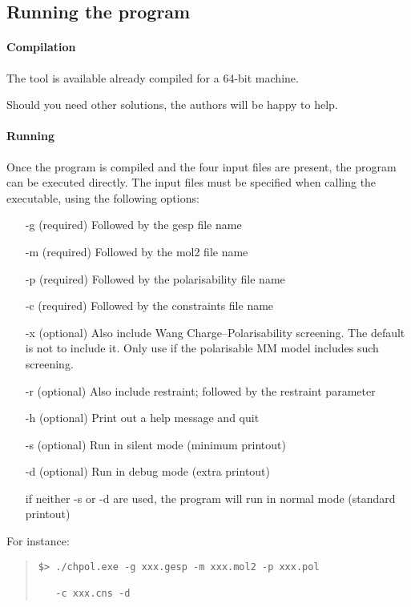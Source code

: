 \documentclass[a4paper]{report}
\begin{document}
\subsection*{Running the program}

\paragraph*{Compilation}

The tool is available already compiled for a 64-bit machine.

Should you need other solutions, the authors will be happy to help.

\paragraph*{Running}

Once the program is compiled and the four input files are present, the program can
be executed directly. The input files must be specified when calling the executable,
using the following options:
\begin{itemize}
\item[-g] (required) Followed by the gesp file name
\item[-m] (required) Followed by the mol2 file name
\item[-p] (required) Followed by the polarisability file name
\item[-c] (required) Followed by the constraints file name
\item[-x] (optional) Also include Wang Charge--Polarisability screening. The default is not to include it. Only use if the polarisable MM model includes such screening.
\item[-r] (optional) Also include restraint; followed by the restraint parameter
\item[-h] (optional) Print out a help message and quit
\item[-s] (optional) Run in silent mode (minimum printout)
\item[-d] (optional) Run in debug mode (extra printout)
\item[] if neither -s or -d are used, the program will run in normal mode (standard
printout)
\end{itemize}

For instance:
\begin{framed}
\begin{quote}
\begin{verbatim}
$> ./chpol.exe -g xxx.gesp -m xxx.mol2 -p xxx.pol 

   -c xxx.cns -d
\end{verbatim}
\end{quote}
\end{framed}
\end{document}
